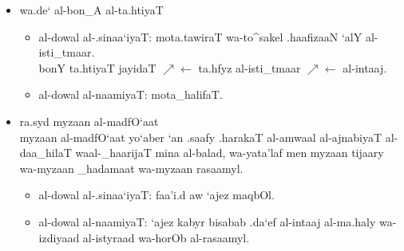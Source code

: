 \begin{itemize}
    \item wa.de` al-bon_A al-ta.htiyaT
    \begin{itemize}
        \item al-dowal al-.sinaa`iyaT: mota.tawiraT wa-to^sakel .haafizaaN `alY
            al-isti_tmaar.\\
            bonY ta.htiyaT jayidaT
            $\nearrow\leftarrow$ ta.hfyz al-isti_tmaar
            $\nearrow\leftarrow$ al-intaaj.
        \item al-dowal al-naamiyaT: mota_halifaT.
    \end{itemize}
\end{itemize}
\begin{itemize}
    \item ra.syd myzaan al-madfO`aat\\
        myzaan al-madfO`aat yo`aber `an .saafy .harakaT al-amwaal al-ajnabiyaT
        al-daa_hilaT waal-_haarijaT mina al-balad, wa-yata'laf men myzaan tijaary 
        wa-myzaan _hadamaat wa-myzaan rasaamyl.
    \begin{itemize}
        \item al-dowal al-.sinaa`iyaT: faa'i.d aw `ajez maqbOl.
        \item al-dowal al-naamiyaT: `ajez kabyr bisabab .da`ef al-intaaj
            al-ma.haly wa-izdiyaad al-istyraad wa-horOb al-rasaamyl.
    \end{itemize}
\end{itemize}
